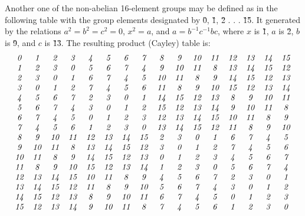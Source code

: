 \documentclass[12pt]{article}
\begin{document}
 Another one of the non-abelian 16-element groups may be defined as in the
following table with the group elements designated by \G0, \G1,
\G2 . . . \G1\G5.  It generated 
by the relations $a^2 = b^2 = c^2 = 0$, $x^2 = a$, and
$a = b^{-1}c^{-1}bc$, where $x$ is \G1, $a$ is \G2, $b$ is \G9, and
$c$ is \G1\G3.  The resulting product (Cayley) table is:
\begin{displaymath}
\begin{array}{cccccccccccccccc}
\G0 & \G1 & \G2 & \G3 & \G4 & \G5 & \G6 & \G7 & \G8 & \G9 & \G1\G0 & \G1\G1 & 
\G1\G2 & \G1\G3 & \G1\G4 & \G1\G5\\
\G1 & \G2 & \G3 & \G0 & \G5 & \G6 & \G7 & \G4 & \G9 & \G1\G0 &
 \G1\G1 & \G8 & \G1\G3 & \G1\G4 & \G1\G5 & \G1\G2\\
\G2 & \G3 & \G0 & \G1 & \G6 & \G7 & \G4 & \G5 & \G1\G0 & \G1\G1 &
 \G8 & \G9 & \G1\G4 & \G1\G5 & \G1\G2 & \G1\G3\\
\G3 & \G0 & \G1 & \G2 & \G7 & \G4 & \G5 & \G6 & \G1\G1 & \G8 & \G9 &
 \G1\G0 & \G1\G5 & \G1\G2 & \G1\G3 & \G1\G4\\
\G4 & \G5 & \G6 & \G7 & \G2 & \G3 & \G0 & \G1 & \G1\G4 & \G1\G5 &
 \G1\G2 & \G1\G3 & \G8 & \G9 & \G1\G0 & \G1\G1\\
\G5 & \G6 & \G7 & \G4 & \G3 & \G0 & \G1 & \G2 & \G1\G5 & \G1\G2 & 
\G1\G3 & \G1\G4 & \G9 & \G1\G0 & \G1\G1 & \G8\\
\G6 & \G7 & \G4 & \G5 & \G0 & \G1 & \G2 & \G3 & \G1\G2 & \G1\G3 &
 \G1\G4 & \G1\G5 & \G1\G0 & \G1\G1 & \G8 & \G9\\
\G7 & \G4 & \G5 & \G6 & \G1 & \G2 & \G3 & \G0 & \G1\G3 & \G1\G4 &
 \G1\G5 & \G1\G2 & \G1\G1 & \G8 & \G9 & \G1\G0\\
\G8 & \G9 & \G1\G0 & \G1\G1 & \G1\G2 & \G1\G3 & \G1\G4 & \G1\G5 &
 \G2 & \G3 & \G0 & \G1 & \G6 & \G7 & \G4 & \G5\\
\G9 & \G1\G0 & \G1\G1 & \G8 & \G1\G3 & \G1\G4 & \G1\G5 & \G1\G2 &
 \G3 & \G0 & \G1 & \G2 & \G7 & \G4 & \G5 & \G6\\
\G1\G0 & \G1\G1 & \G8 & \G9 & \G1\G4 & \G1\G5 & \G1\G2 & \G1\G3 &
 \G0 & \G1 & \G2 & \G3 & \G4 & \G5 & \G6 & \G7\\
\G1\G1 & \G8 & \G9 & \G1\G0 & \G1\G5 & \G1\G2 & \G1\G3 & \G1\G4 &
 \G1 & \G2 & \G3 & \G0 & \G5 & \G6 & \G7 & \G4\\
\G1\G2 & \G1\G3 & \G1\G4 & \G1\G5 & \G1\G0 & \G1\G1 & \G8 & \G9 &
 \G4 & \G5 & \G6 & \G7 & \G2 & \G3 & \G0 & \G1\\
\G1\G3 & \G1\G4 & \G1\G5 & \G1\G2 & \G1\G1 & \G8 & \G9 & \G1\G0 &
 \G5 & \G6 & \G7 & \G4 & \G3 & \G0 & \G1 & \G2\\
\G1\G4 & \G1\G5 & \G1\G2 & \G1\G3 & \G8 & \G9 & \G1\G0 & \G1\G1 &
 \G6 & \G7 & \G4 & \G5 & \G0 & \G1 & \G2 & \G3\\
\G1\G5 & \G1\G2 & \G1\G3 & \G1\G4 & \G9 & \G1\G0 & \G1\G1 & \G8 &
 \G7 & \G4 & \G5 & \G6 & \G1 & \G2 & \G3 & \G0
\end{array}
\end{displaymath}
\end{document}
